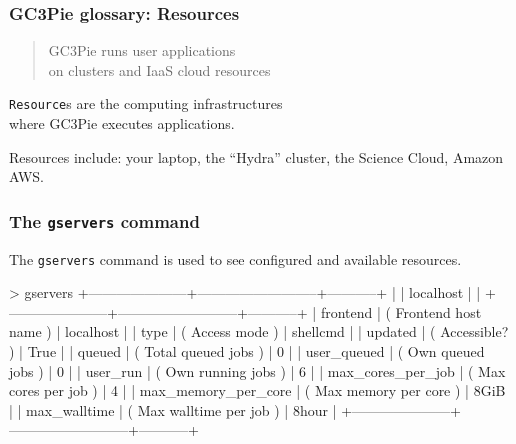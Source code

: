 \documentclass[english,serif,mathserif,usenames,dvipsnames]{beamer}
\begin{document}
\begin{frame}
  \frametitle{GC3Pie glossary: Resources}
  \begin{quote}
    GC3Pie runs user applications
    \\
    on clusters and IaaS cloud \alert{resources}
  \end{quote}

  \+ \alert{\texttt{Resource}s are the computing infrastructures \\ where GC3Pie executes applications.}

  \+ Resources include: your laptop, the ``Hydra'' cluster, the Science Cloud, Amazon AWS.
\end{frame}


\begin{frame}[fragile]
  \frametitle{The \texttt{gservers} command}

  The \texttt{gservers} command is used to see \alert<2>{configured} and
  available resources.

\+
\begin{stdout}
> gservers
+---------------------+--------------------------+-----------+
|                     | localhost                |           |
+---------------------+--------------------------+-----------+
|            frontend | ( Frontend host name )   | localhost |
|                type | ( Access mode )          | shellcmd  |
|             updated | ( Accessible? )          | True      |
|              queued | ( Total queued jobs )    | 0         |
|         user_queued | ( Own queued jobs )      | 0         |
|            user_run | ( Own running jobs )     | 6         |
|   max_cores_per_job | ( Max cores per job )    | 4         |
| max_memory_per_core | ( Max memory per core )  | 8GiB      |
|        max_walltime | ( Max walltime per job ) | 8hour     |
+---------------------+--------------------------+-----------+
\end{stdout}


  \+
  \begin{flushright}
    \hyperlink{resources}{}
  \end{flushright}
\end{frame}
\end{document}

